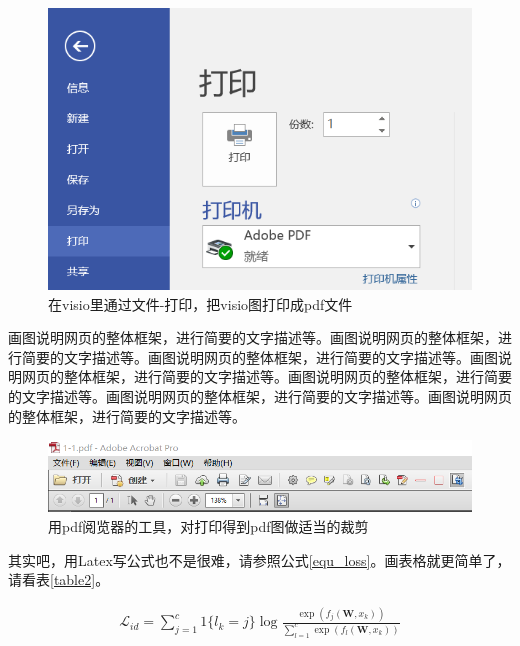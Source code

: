 \documentclass[supercite]{Experimental_Report}
\theoremstyle{definition}
\begin{document}
\begin{figure}[htb]
	\begin{center}
		\includegraphics[scale=0.60]{images/1-2.png}
		\caption{在visio里通过文件-打印，把visio图打印成pdf文件}
		\label{fig1-2}
		\end{center}
\end{figure}

画图说明网页的整体框架，进行简要的文字描述等。画图说明网页的整体框架，进行简要的文字描述等。画图说明网页的整体框架，进行简要的文字描述等。画图说明网页的整体框架，进行简要的文字描述等。画图说明网页的整体框架，进行简要的文字描述等。画图说明网页的整体框架，进行简要的文字描述等。画图说明网页的整体框架，进行简要的文字描述等。

\begin{figure}[htb]
	\begin{center}
		\includegraphics[scale=0.50]{images/1-3.png}
		\caption{用pdf阅览器的工具，对打印得到pdf图做适当的裁剪}
		\label{fig1-3}
	\end{center}
\end{figure}

其实吧，用Latex写公式也不是很难，请参照公式\ref{equ_loss}。画表格就更简单了，请看表\ref{table2}。

\begin{eqnarray}\label{equ_loss}
	\mathcal{L}_{id}=\sum_{j=1}^{c}1\{l_k=j\}\log\frac{\exp(f_j(\textbf{W},x_k))}{\sum\nolimits_{l=1}^{c}\exp(f_l(\textbf{W},x_k))}
\end{eqnarray}
\end{document}
